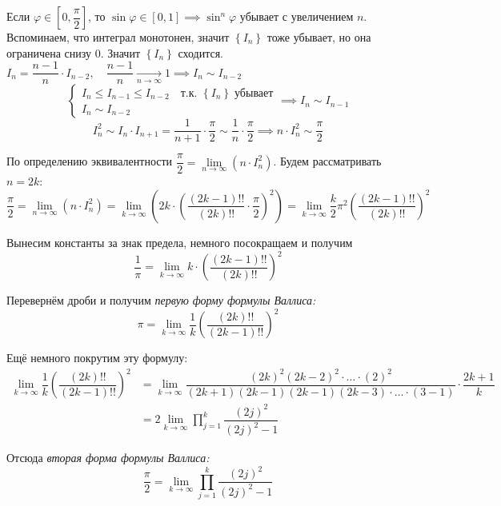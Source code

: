 \documentclass[../main.tex]{subfiles}
\begin{document}
Если \( \varphi \in \left[ 0, \dfrac{ \pi}{ 2}  \right]\), то \( \sin \varphi \in \left[ 0, 1\right] \implies \sin^n \varphi \) убывает с увеличением \( n\). Вспоминаем, что интеграл монотонен, значит \( \left\{ I_n\right\}\) тоже убывает, но она ограничена снизу 0. 
Значит \( \left\{ I_n\right\}\) сходится. \( I_n = \dfrac{ n-1}{ n} \cdot I_{n-2},\quad \dfrac{ n-1}{ n} \underset{n \rightarrow \infty }{\longrightarrow} 1 \implies I_n \sim I_{n-2}\)
\begin{equation*}
    \begin{cases}
        I_n \leq I_{n-1} \leq I_{n-2}\quad \text{т.к. } \left\{ I_n\right\}\;\text{убывает}\\ 
        I_n \sim I_{n-2}
    \end{cases}
    \implies 
    I_n \sim I_{n-1}
\end{equation*}
\[ I_n^2 \sim I_n \cdot I_{n+1}= \dfrac{ 1}{ n+1} \cdot \dfrac{ \pi}{ 2} \sim \dfrac{ 1}{ n} \cdot \dfrac{ \pi}{ 2} \implies n \cdot I_n^2 \sim \dfrac{ \pi}{ 2}   \]

По определению эквивалентности \( \dfrac{ \pi}{ 2} = \lim\limits_{ n\rightarrow \infty } \left( n \cdot I_n^2\right) \). Будем рассматривать \( n=2k\):
\[ \dfrac{ \pi}{ 2} = \lim\limits_{ n\rightarrow \infty } \left( n \cdot I_n^2\right)= \lim\limits_{ k\rightarrow \infty } \left( 2k \cdot \left( \dfrac{ (2k-1)!!}{ (2k)!!} \cdot \dfrac{ \pi}{ 2}  \right)^2\right)= \lim\limits_{ k\rightarrow \infty } \dfrac{ k}{ 2} \pi ^2\left( \dfrac{ (2k-1)!!}{ (2k)!!} \right)^2\]

Вынесим константы за знак предела, немного посокращаем и получим 
\[ \dfrac{ 1}{ \pi } = \lim\limits_{ k\rightarrow \infty } k \cdot \left( \dfrac{ (2k-1)!!}{ (2k)!!} \right)^2\]

Перевернём дроби и получим \emph{первую форму формулы Валлиса:}
\[ \boxed{ \pi = \lim\limits_{ k \rightarrow \infty } \dfrac{ 1}{ k} \left( \dfrac{ (2k)!!}{ (2k-1)!!} \right)^2}\]

Ещё немного покрутим эту формулу: 
\begin{equation*}
    \begin{aligned}
        \lim\limits_{ k \rightarrow \infty } \dfrac{ 1}{ k} \left( \dfrac{ (2k)!!}{ (2k-1)!!} \right)^2&= \lim\limits_{ k\rightarrow \infty } \dfrac{ (2k)^2(2k-2)^2\cdot\ldots\cdot(2)^2}{ (2k+1)(2k-1)(2k-1)(2k-3)\cdot\ldots\cdot(3-1)} \cdot \dfrac{ 2k+1}{ k} \\
        &= 2 \lim\limits_{ k\rightarrow \infty } \displaystyle\prod\limits_{j=1}^k \dfrac{ (2j)^2}{ (2j)^2-1} 
    \end{aligned}
\end{equation*}

Отсюда \emph{вторая форма формулы Валлиса:}
\[ \boxed{ \dfrac{ \pi}{ 2} =\lim\limits_{ k\rightarrow \infty } \displaystyle\prod\limits_{j=1}^k \dfrac{ (2j)^2}{ (2j)^2-1} }\] 
\end{document}
